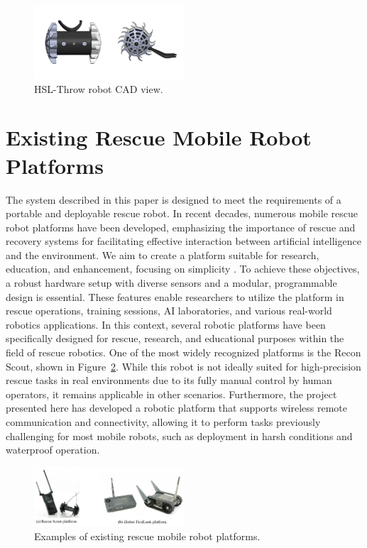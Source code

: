 \documentclass[conference]{IEEEtran}
\begin{document}
\begin{figure}[htbp]
\centerline{\includegraphics[width=0.5\textwidth]{Fig_First.PNG}}
\caption{HSL-Throw robot CAD view.}
\label{fig_First}
\end{figure}

\section{Existing Rescue Mobile Robot Platforms}
The system described in this paper is designed to meet the requirements of a portable and deployable rescue robot. In recent decades, numerous mobile rescue robot platforms have been developed, emphasizing the importance of rescue and recovery systems for facilitating effective interaction between artificial intelligence and the environment. We aim to create a platform suitable for research, education, and enhancement, focusing on simplicity \cite{Mathew2014, Karimi2017}. To achieve these objectives, a robust hardware setup with diverse sensors and a modular, programmable design is essential. These features enable researchers to utilize the platform in rescue operations, training sessions, AI laboratories, and various real-world robotics applications. In this context, several robotic platforms have been specifically designed for rescue, research, and educational purposes within the field of rescue robotics. One of the most widely recognized platforms is the Recon Scout, shown in Figure~\ref{Fig_iRobotAndRecon}. While this robot is not ideally suited for high-precision rescue tasks in real environments due to its fully manual control by human operators, it remains applicable in other scenarios. Furthermore, the project presented here has developed a robotic platform that supports wireless remote communication and connectivity, allowing it to perform tasks previously challenging for most mobile robots, such as deployment in harsh conditions and waterproof operation.

\begin{figure}[htbp] 
    \centerline{\includegraphics[width=0.5\textwidth]{Fig_iRobotAndRecon.PNG}} 
    \caption{Examples of existing rescue mobile robot platforms.} 
    \label{Fig_iRobotAndRecon} 
\end{figure}
\end{document}
